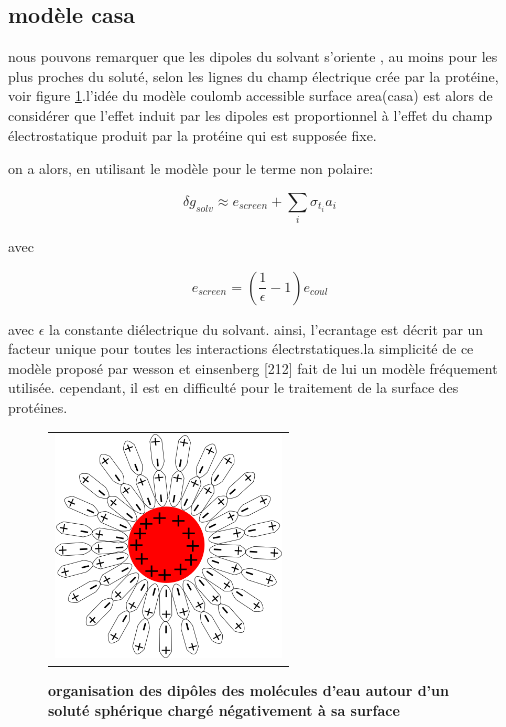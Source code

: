\subsection{modèle casa}

nous pouvons remarquer que les dipoles du solvant s'oriente , au moins pour les plus proches du soluté, selon les lignes du champ électrique crée par la protéine, voir figure \ref{graph:ecrantage}.l'idée du modèle \og coulomb accessible surface area\fg (casa)  est alors de considérer que l'effet induit par les dipoles est proportionnel à l'effet du champ électrostatique produit par la protéine qui est supposée fixe. 

on a  alors, en utilisant le modèle  pour le terme non polaire:

\begin{equation}
\delta g_{solv} \approx e_{screen} + \sum_i \sigma_{t_i} a_i
\end{equation}

avec 

\begin{equation}
e_{screen} =  (\frac{1}{\epsilon} -1 )e_{coul}
\end{equation}

avec $ \epsilon $ la constante diélectrique du solvant.
ainsi, l'ecrantage est décrit par un facteur unique pour toutes les interactions électrstatiques.la simplicité de ce modèle proposé par wesson et einsenberg [212] fait de lui un modèle fréquement utilisée. cependant, il est en difficulté pour le traitement de la surface des protéines.


   \begin{figure}[t]
     \centering
     \begin{tabular}{c}
       \includegraphics[width=6cm]{figure/ecrantage.png} &
     \end{tabular}
     
     \caption{\textbf{organisation des dipôles des molécules d'eau autour d'un soluté sphérique chargé négativement à sa surface}}
\label{graph:ecrantage}
   \end{figure}
   


